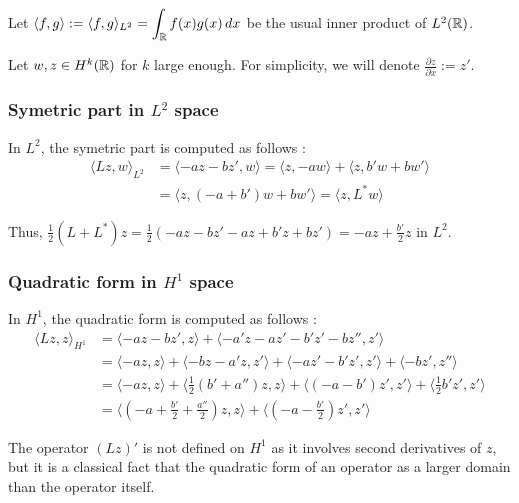 \documentclass[11pt,a4paper]{article}
\begin{document}
Let $\langle f, g \rangle := \langle f, g \rangle_{L^2} = \displaystyle \int_\mathbb R  f(x)g(x)\,dx$ be the usual inner product of $L^2(\mathbb R)$.

Let $w,z \in H^k(\mathbb R)$ for $k$ large enough. For simplicity, we will denote $\frac{\partial z}{\partial x} := z'$.

\subsubsection{Symetric part in $L^2$ space}
In $L^2$, the symetric part is computed as follows :
\begin{align*}
  \langle Lz, w \rangle_{L^2}  &=   \langle -az - bz', w \rangle =  \langle z, -aw \rangle  +   \langle z, b'w+bw' \rangle    \\
                  &= \langle z, (-a+b')w + bw' \rangle = \langle z, L^*w \rangle
\end{align*}

Thus, $\frac{1}{2}(L+L^*)z = \frac{1}{2}(-az-bz' -az +b'z+bz') \displaystyle =-az+\frac{b'}{2}z$ in $L^2$.

\subsubsection{Quadratic form in $H^1$ space}
In $H^1$, the quadratic form is computed as follows :
\begin{align*}
  \langle Lz, z \rangle_{H^1}   &=   \langle -az - bz', z \rangle +  \langle -a'z-az' - b'z'-bz'', z' \rangle \\
  &=  \langle -az, z \rangle + \langle -bz - a'z, z' \rangle + \langle - az'-b'z', z' \rangle + \langle - bz', z'' \rangle \\
  &=  \langle -az, z \rangle + \langle \frac{1}{2}(b'+a'')z, z \rangle + \langle (-a-b')z', z' \rangle + \langle \frac{1}{2} b' z', z' \rangle \\
  &=  \langle (-a+ \frac{b'}{2}+\frac{a''}{2})z, z \rangle +  \langle (-a-\frac{b'}{2})z', z' \rangle 
\end{align*}

\begin{rmq}
The operator $(Lz)'$ is not defined on $H^1$ as it involves second derivatives of $z$, but it is a classical fact that the quadratic form of an operator as a larger domain than the operator itself.
\end{rmq}
\end{document}
